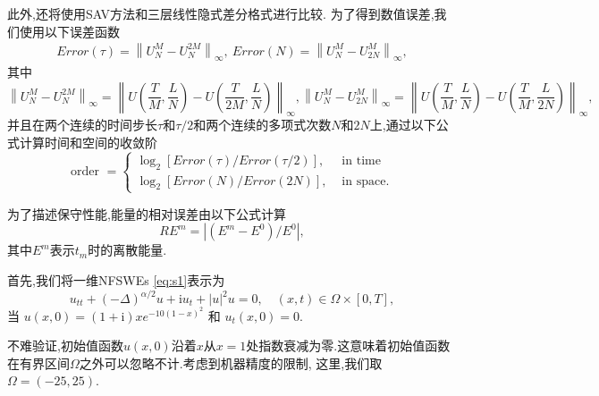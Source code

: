 此外,还将使用SAV方法\cite{chengConvergenceEnergyconservingScheme2022}和三层线性隐式差分格式\cite{wangConservativeLinearizedDifference2015}进行比较. 为了得到数值误差,我们使用以下误差函数
\begin{align}\label{eq_103}
Error(\tau)=\left\|U_{N}^{M}-U_{N}^{2 M}\right\|_{\infty},~Error(N)=\left\|U_{N}^{M}-U_{2 N}^{M}\right\|_{\infty},
\end{align}
其中
$$\left\|U_{N}^{M}-U_{N}^{2 M}\right\|_{\infty}=\left\|U\left(\frac{T}{M}, \frac{L}{N}\right)-U\left(\frac{T}{2 M}, \frac{L}{N}\right)\right\|_{\infty},\left\|U_{N}^{M}-U_{2 N}^{M}\right\|_{\infty}=\left\|U\left(\frac{T}{M}, \frac{L}{N}\right)-U\left(\frac{T}{M}, \frac{L}{2 N}\right)\right\|_{\infty},$$
并且在两个连续的时间步长$\tau$和$\tau / 2$和两个连续的多项式次数$N$和$2 N$上,通过以下公式计算时间和空间的收敛阶
\begin{equation}
\text { order }= \left\{
\begin{aligned}
\log _{2}[Error(\tau) / Error(\tau / 2)], & \text { in time } \\
\log _{2}[Error(N) / Error(2 N)], & \text { in space. }
\end{aligned}\right.\label{eq_104}
\end{equation}

为了描述保守性能,能量的相对误差由以下公式计算
\begin{equation}\label{eq_105}
R E^{m}=\left|\left(E^{m}-E^{0}\right) / E^{0}\right|,
\end{equation}
其中$E^{m}$表示$t_m$时的离散能量.


\begin{example}\label{ex:1}
    首先,我们将一维NFSWEs \eqref{eq:s1}表示为
\begin{equation}\label{eq_108}
u_{t t}+(-\Delta)^{\alpha / 2} u+\mathrm{i}u_t+|u|^2 u=0, \quad (x,t)\in  \Omega\times[0, T],
\end{equation}
当 $u(x, 0)=(1+\mathrm{i}) x e^{-10(1-x)^2}$ 和 $u_t(x, 0)=0$.
\end{example}

不难验证,初始值函数$u(x, 0)$沿着$x$从$x=1$处指数衰减为零.这意味着初始值函数在有界区间$\Omega$之外可以忽略不计.考虑到机器精度的限制, 这里,我们取$\Omega=(-25,25)$.

